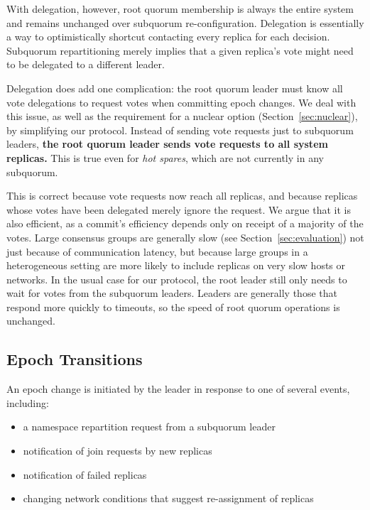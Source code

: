 With delegation, however, root quorum membership is always the entire system and remains unchanged over subquorum re-configuration.
Delegation is essentially a way to optimistically shortcut contacting every replica for each decision.
Subquorum repartitioning merely implies that a given replica's vote might need to be delegated to a different leader.

Delegation does add one complication: the root quorum leader must know all vote delegations to request votes when committing epoch changes.
We deal with this issue, as well as the requirement for a nuclear option (Section~\ref{sec:nuclear}), by simplifying our protocol.
Instead of sending vote requests just to subquorum leaders, \textbf{the root quorum leader sends vote requests to all system replicas.}
This is true even for \emph{hot spares}, which are not currently in any subquorum.

This is correct because vote requests now reach all replicas, and because replicas whose votes have been delegated merely ignore the request.
We argue that it is also efficient, as a commit's efficiency depends only on receipt of a majority of the votes.
Large consensus groups are generally slow (see Section~\ref{sec:evaluation}) not just because of communication latency, but because large groups in a heterogeneous setting are more likely to include replicas on very slow hosts or networks.
In the usual case for our protocol, the root leader still only needs to wait for votes from the subquorum leaders.
Leaders are generally those that respond more quickly to timeouts, so the
speed of root quorum operations is unchanged.

\subsection{Epoch Transitions}


An epoch change is initiated by the leader in response to one of several events, including:

\renewcommand{\baselinestretch}{1}
\begin{itemize}
    \item a namespace repartition request from a subquorum leader
    \item notification of join requests by new replicas
    \item notification of failed replicas
    \item changing network conditions that suggest re-assignment of replicas
\end{itemize}
\renewcommand{\baselinestretch}{2}

